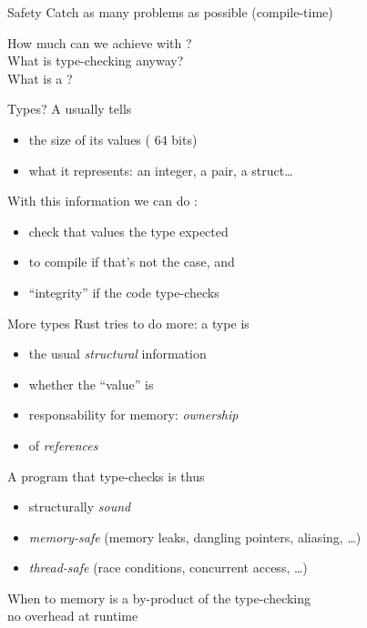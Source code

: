 \documentclass[10pt]{beamer}
\begin{document}
\begin{frame}{Safety}
  Catch as many problems as possible  (compile-time)
  \bigskip
  \begin{center}
    How much can we achieve with ?\\
    What is type-checking anyway?\\
    What is a ?
  \end{center}
\end{frame}





\begin{frame}{Types?}
  A  usually tells
  \begin{itemize}
    \item the size of its values ( $64$ bits)
    \item what it represents: an integer, a pair, a struct\ldots
  \end{itemize}
  \bigskip
  \pause
  With this information we can do :
  \begin{itemize}
    \item check that values  the type expected
    \item {} to compile if that's not the case, and
    \item {} ``integrity'' if the code type-checks
  \end{itemize}
\end{frame}





\begin{frame}{More types}
  Rust tries to do more: a type is
  \begin{itemize}
    \item the usual \emph{structural} information
    \item whether the ``value'' is 
    \item responsability for  memory: \emph{ownership}
    \item {} of \emph{references}
  \end{itemize}
  \bigskip
  \pause
  A program that type-checks is thus 
  \begin{itemize}
    \item structurally \emph{sound}
    \item \emph{memory-safe}
      (memory leaks, dangling pointers, aliasing, \ldots)
    \item \emph{thread-safe}
      (race conditions, concurrent access, \ldots)
  \end{itemize}
  \medskip
  \pause
  When to  memory is a by-product of the type-checking\\
  \daimpl no overhead at runtime
\end{frame}
\end{document}
